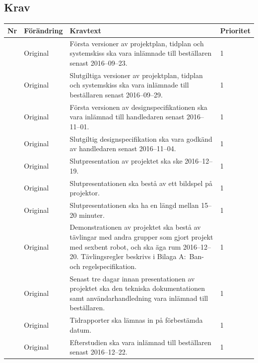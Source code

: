 \documentclass[a4paper,titlepage,12pt]{article}
\newcounter{reqNr}
\newcommand{\nextReqNr}{\stepcounter{reqNr}\arabic{reqNr}}
\begin{document}
	\subsection{Krav}
	\begin{longtable}[c]{ c l>{\raggedright}p{} l }
		\textbf{Nr} & \textbf{Förändring} & \textbf{Kravtext} & \textbf{Prioritet} 
			\\ \midrule

		\nextReqNr{} & Original & Första versioner av
        projektplan, tidplan och systemskiss ska vara inlämnade till
        beställaren senast 2016--09--23. & 1
			\\ \midrule

		\nextReqNr{} & Original & Slutgiltiga versioner av
        projektplan, tidplan och systemskiss ska vara inlämnade till
        beställaren senast 2016--09--29. & 1
			\\ \midrule

		\nextReqNr{} & Original & Första versionen av
			designspecifikationen ska vara inlämnad till handledaren senast
			2016--11--01. & 1
			\\ \midrule

		\nextReqNr{} & Original & Slutgiltig designspecifikation
			ska vara godkänd av handledaren senast 2016--11--04. & 1
			\\ \midrule
			
		\nextReqNr{} & Original & Slutpresentation av projektet ska
		ske 2016--12--19. & 1
			\\ \midrule

		\nextReqNr{} & Original & Slutpresentationen ska bestå av
		ett bildspel på projektor. & 1
			\\ \midrule

		\nextReqNr{} & Original & Slutpresentationen ska ha en
		längd mellan 15--20 minuter. & 1
			\\ \midrule

		\nextReqNr{} & Original & Demonstrationen av projektet ska
		bestå av tävlingar med andra grupper som gjort projekt med sexbent
		robot, och ska äga rum 2016--12--20. Tävlingsregler beskrivs i Bilaga
		A:\ Ban- och regelspecifikation. & 1
			\\ \midrule

		\nextReqNr{} & Original & Senast tre dagar innan
			presentationen av projektet ska den tekniska dokumentationen
			samt användarhandledning vara inlämnad till beställaren. & 1
			\\ \midrule

		\nextReqNr{} & Original & Tidrapporter ska lämnas in på förbestämda datum.  & 1
			\\ \midrule

		\nextReqNr{} & Original & Efterstudien ska vara inlämnad
		till beställaren senast 2016--12--22. & 1
			\\ 

	\end{longtable}
	
\end{document}
